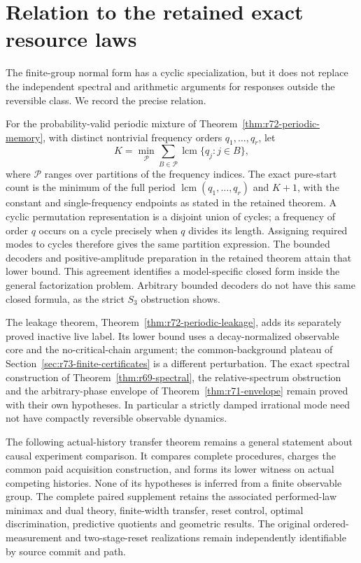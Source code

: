 \section{Relation to the retained exact resource laws}
\label{sec:r73-consequences}
The finite-group normal form has a cyclic specialization, but it does not
replace the independent spectral and arithmetic arguments for responses
outside the reversible class. We record the precise relation.

For the probability-valid periodic mixture of
Theorem~\ref{thm:r72-periodic-memory}, with distinct nontrivial frequency
orders $q_1,\ldots,q_r$, let
\[
 K=\min_{\mathcal P}\sum_{B\in\mathcal P}
                  \operatorname{lcm}\{q_j:j\in B\},
\]
where $\mathcal P$ ranges over partitions of the frequency indices.
The exact pure-start count is the minimum of the full period
$\operatorname{lcm}(q_1,\ldots,q_r)$ and $K+1$, with the constant and
single-frequency endpoints as stated in the retained theorem.
A cyclic permutation representation is a disjoint union of cycles; a
frequency of order $q$ occurs on a cycle precisely when $q$ divides its
length. Assigning required modes to cycles therefore gives the same
partition expression. The bounded decoders and positive-amplitude
preparation in the retained theorem attain that lower bound. This agreement
identifies a model-specific closed form inside the general factorization
problem. Arbitrary bounded decoders do not have this same closed formula,
as the strict $S_3$ obstruction shows.

The leakage theorem, Theorem~\ref{thm:r72-periodic-leakage}, adds its
separately proved inactive live label. Its lower bound uses a
decay-normalized observable core and the no-critical-chain argument;
the common-background plateau of Section~\ref{sec:r73-finite-certificates}
is a different perturbation. The exact spectral construction of
Theorem~\ref{thm:r69-spectral}, the relative-spectrum obstruction and
the arbitrary-phase envelope of Theorem~\ref{thm:r71-envelope} remain
proved with their own hypotheses. In particular a strictly damped
irrational mode need not have compactly reversible observable dynamics.

The following actual-history transfer theorem remains a general statement
about causal experiment comparison. It compares complete procedures,
charges the common paid acquisition construction, and forms its lower
witness on actual competing histories. None of its hypotheses is inferred
from a finite observable group. The complete paired supplement retains the
associated performed-law minimax and dual theory, finite-width transfer,
reset control, optimal discrimination, predictive quotients and geometric
results. The original ordered-measurement and two-stage-reset realizations
remain independently identifiable by source commit and path.
